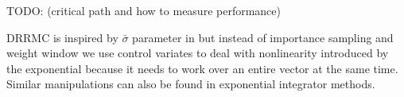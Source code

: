 \documentclass[a4paper,12pt]{article}
\begin{document}




TODO:
(critical path and how to measure performance)

\begin{related}[DRRMC]
    DRRMC is inspired by  $\bar{\sigma}$ parameter in \cite{sawhney_grid-free_2022} but
    instead of importance sampling and weight window we use control variates  to deal with
    nonlinearity introduced by the exponential because it needs to work over
    an entire vector at the same time.
    Similar manipulations can also be found in exponential integrator methods.
\end{related}




\end{document}
